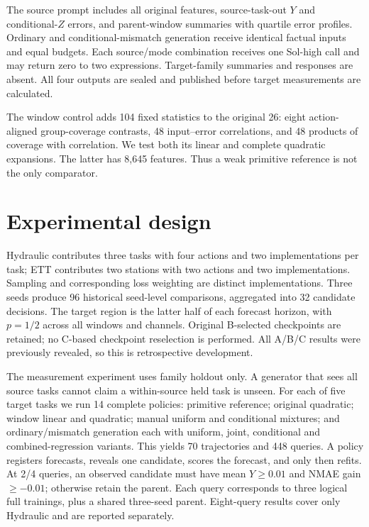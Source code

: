 \documentclass[10pt]{article}
\begin{document}
The source prompt includes all original features, source-task-out $Y$ and conditional-$Z$ errors, and parent-window summaries with quartile error profiles.
Ordinary and conditional-mismatch generation receive identical factual inputs and equal budgets.
Each source/mode combination receives one Sol-high call and may return zero to two expressions.
Target-family summaries and responses are absent.
All four outputs are sealed and published before target measurements are calculated.

The window control adds 104 fixed statistics to the original 26:
eight action-aligned group-coverage contrasts, 48 input--error correlations, and 48 products of coverage with correlation.
We test both its linear and complete quadratic expansions.
The latter has 8,645 features.
Thus a weak primitive reference is not the only comparator.

\section{Experimental design}
Hydraulic contributes three tasks with four actions and two implementations per task; ETT contributes two stations with two actions and two implementations.
Sampling and corresponding loss weighting are distinct implementations.
Three seeds produce 96 historical seed-level comparisons, aggregated into 32 candidate decisions.
The target region is the latter half of each forecast horizon, with $p=1/2$ across all windows and channels.
Original B-selected checkpoints are retained; no C-based checkpoint reselection is performed.
All A/B/C results were previously revealed, so this is retrospective development.

The measurement experiment uses family holdout only.
A generator that sees all source tasks cannot claim a within-source held task is unseen.
For each of five target tasks we run 14 complete policies:
primitive reference; original quadratic; window linear and quadratic; manual uniform and conditional mixtures; and ordinary/mismatch generation each with uniform, joint, conditional and combined-regression variants.
This yields 70 trajectories and 448 queries.
A policy registers forecasts, reveals one candidate, scores the forecast, and only then refits.
At 2/4 queries, an observed candidate must have mean $Y\geq0.01$ and NMAE gain $\geq-0.01$; otherwise retain the parent.
Each query corresponds to three logical full trainings, plus a shared three-seed parent.
Eight-query results cover only Hydraulic and are reported separately.
\end{document}
